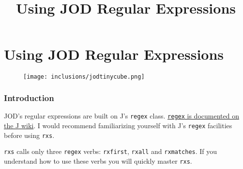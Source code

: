 \documentclass[11pt,letter,landscape]{article}
\title{Using JOD Regular Expressions}
\makeatletter
\def\maxwidth{\ifdim\Gin@nat@width>\linewidth\linewidth
    \else\Gin@nat@width\fi}
\let\Oldincludegraphics\includegraphics
\renewcommand{\includegraphics}[1]{\Oldincludegraphics[width=.8\maxwidth]{#1}}
\makeatother
\begin{document}
    
    
    \maketitle
    
    

    
    \section{Using JOD Regular
Expressions}\label{using-jod-regular-expressions}

\begin{figure}
\centering
\texttt{[image: inclusions/jodtinycube.png]}
\caption{}
\end{figure}

    \subsubsection{Introduction}\label{introduction}

JOD's regular expressions are built on J's \texttt{regex} class.
\href{https://code.jsoftware.com/wiki/Guides/Regular_Expressions/Verbs}{\texttt{regex}
is documented on the J wiki}. I would recommend familiarizing yourself
with J's \texttt{regex} facilities before using \texttt{rxs}.

\texttt{rxs} calls only three \texttt{regex} verbs: \texttt{rxfirst},
\texttt{rxall} and \texttt{rxmatches}. If you understand how to use
these verbs you will quickly master \texttt{rxs}.
\end{document}
